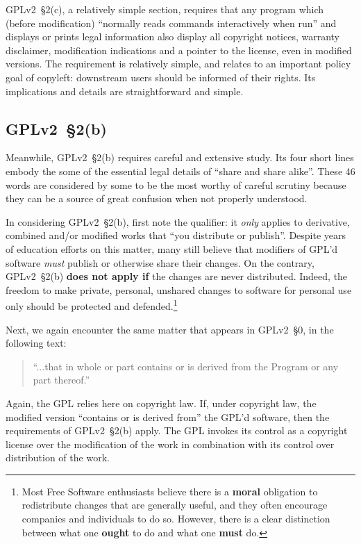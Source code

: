 GPLv2~\S2(c), a relatively simple section, requires that any program which
(before modification) ``normally reads commands interactively when run'' and
displays or prints legal information also display all copyright notices,
warranty disclaimer, modification indications and a pointer to the license,
even in modified versions.  The requirement is relatively simple, and relates
to an important policy goal of copyleft: downstream users should be informed
of their rights.  Its implications and details are straightforward and
simple.

\subsection{GPLv2~\S2(b)}

Meanwhile, GPLv2~\S2(b) requires careful and extensive study.  Its four short lines embody
the some of the essential legal details of ``share and share alike''.  These 46 words are
considered by some to be the most worthy of careful scrutiny because they
can be a source of great confusion when not properly understood.

In considering GPLv2~\S2(b), first note the qualifier: it \textit{only} applies to
derivative, combined and/or modified works that ``you distribute or publish''.  Despite years of
education efforts on this matter, many still believe that modifiers
of GPL'd software \textit{must} publish or otherwise
share their changes.  On the contrary, GPLv2~\S2(b) {\bf does not apply if} the
changes are never distributed.  Indeed, the freedom to make private,
personal, unshared changes to software for personal use only should be
protected and defended.\footnote{Most Free Software enthusiasts believe there is a {\bf
    moral} obligation to redistribute changes that are generally useful,
  and they often encourage companies and individuals to do so.  However, there
  is a clear distinction between what one {\bf ought} to do and what one
  {\bf must} do.}

Next, we again encounter the same matter that appears in GPLv2~\S0, in the
following text:
\begin{quote}
``...that in whole or part contains or is derived from the Program or any part thereof.''
\end{quote}
Again, the GPL relies here on copyright law.
If, under copyright law, the modified version ``contains or is
derived from'' the GPL'd software, then the requirements of GPLv2~\S2(b)
apply.  The GPL invokes its control as a copyright license over the
modification of the work in combination with its control over distribution
of the work.

